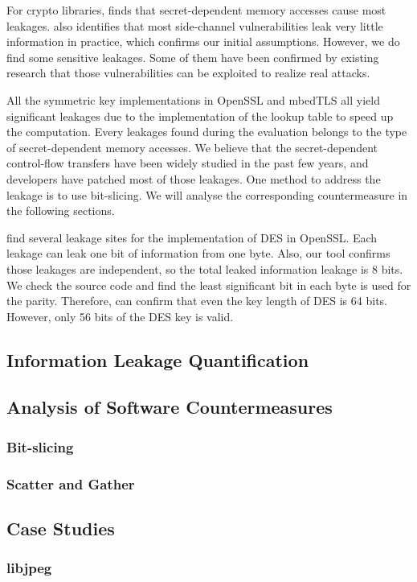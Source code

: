 For crypto libraries, \tool{} finds that secret-dependent memory accesses 
cause most leakages. 
\tool{} also identifies that most side-channel vulnerabilities 
leak very little information in practice, which confirms our initial
assumptions. 
However, we do find some sensitive leakages. 
Some of them have been confirmed by existing research that those 
vulnerabilities can be exploited to realize real attacks. 

All the symmetric key implementations in OpenSSL and mbedTLS all yield
significant leakages due to the implementation of the lookup table
to speed up the computation. Every leakages found during the evaluation
belongs to the type of secret-dependent memory accesses. We believe that
the secret-dependent control-flow transfers have been widely studied in
the past few years, and developers have patched most of those leakages. 
One method to address the leakage is to use bit-slicing. We will analyse
the corresponding countermeasure in the following sections.

\tool{} find several leakage sites for the implementation of DES in OpenSSL.
Each leakage can leak one bit of information from one byte. Also, our tool
confirms those leakages are independent, so the total leaked information leakage
is 8 bits. We check the source code and find the least significant
bit in each byte is used for the parity. Therefore, \tool{} can confirm
that even the key length of DES is 64 bits. However, only 56 bits of the 
DES key is valid. 



\subsection{Information Leakage Quantification}
\subsection{Analysis of Software Countermeasures}
\subsubsection{Bit-slicing}
\subsubsection{Scatter and Gather}
\subsection{Case Studies}
\subsubsection{libjpeg}

